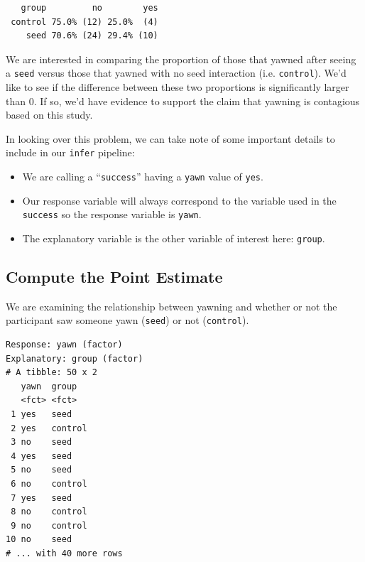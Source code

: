 \documentclass[]{article}
\newenvironment{Shaded}{\begin{snugshade}}{\end{snugshade}}
\newcommand{\KeywordTok}[1]{\textcolor[rgb]{0.13,0.29,0.53}{\textbf{#1}}}
\newcommand{\DataTypeTok}[1]{\textcolor[rgb]{0.13,0.29,0.53}{#1}}
\newcommand{\StringTok}[1]{\textcolor[rgb]{0.31,0.60,0.02}{#1}}
\newcommand{\OperatorTok}[1]{\textcolor[rgb]{0.81,0.36,0.00}{\textbf{#1}}}
\newcommand{\NormalTok}[1]{#1}
\providecommand{\tightlist}{%
  \setlength{\itemsep}{0pt}\setlength{\parskip}{0pt}}
\begin{document}
\begin{verbatim}
   group         no        yes
 control 75.0% (12) 25.0%  (4)
    seed 70.6% (24) 29.4% (10)
\end{verbatim}

We are interested in comparing the proportion of those that yawned after
seeing a \texttt{seed} versus those that yawned with no seed interaction
(i.e. \texttt{control}). We'd like to see if the difference between
these two proportions is significantly larger than 0. If so, we'd have
evidence to support the claim that yawning is contagious based on this
study.

In looking over this problem, we can take note of some important details
to include in our \texttt{infer} pipeline:

\begin{itemize}
\tightlist
\item
  We are calling a ``\texttt{success}'' having a \texttt{yawn} value of
  \texttt{yes}.
\item
  Our response variable will always correspond to the variable used in
  the \texttt{success} so the response variable is \texttt{yawn}.
\item
  The explanatory variable is the other variable of interest here:
  \texttt{group}.
\end{itemize}

\subsection{Compute the Point
Estimate}\label{compute-the-point-estimate}

We are examining the relationship between yawning and whether or not the
participant saw someone yawn (\texttt{seed}) or not (\texttt{control}).

\begin{Shaded}
\end{Shaded}

\begin{verbatim}
Response: yawn (factor)
Explanatory: group (factor)
# A tibble: 50 x 2
   yawn  group  
   <fct> <fct>  
 1 yes   seed   
 2 yes   control
 3 no    seed   
 4 yes   seed   
 5 no    seed   
 6 no    control
 7 yes   seed   
 8 no    control
 9 no    control
10 no    seed   
# ... with 40 more rows
\end{verbatim}
\end{document}
